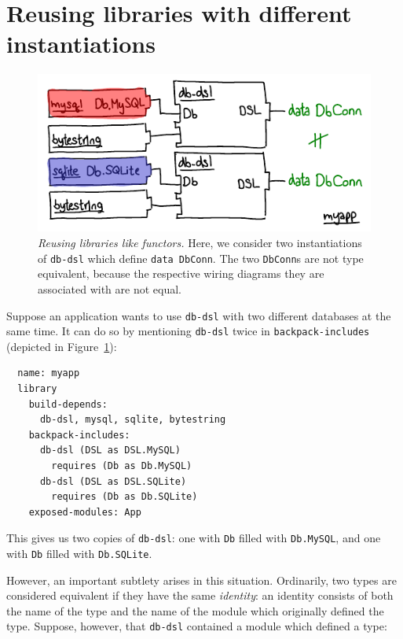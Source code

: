 \section{Reusing libraries with different instantiations}

\begin{figure}
\includegraphics{diagrams/reusing-packages-functors.pdf}
\caption{\emph{Reusing libraries like functors.}  Here, we consider
two instantiations of \texttt{db-dsl} which define \texttt{data DbConn}.
The two \texttt{DbConn}s are not type equivalent, because the respective
wiring diagrams they are associated with are not equal.}
\label{fig:reusing-packages-functors}
\end{figure}

Suppose an application wants to use \verb|db-dsl| with two different databases
at the same time. It can do so by mentioning \verb|db-dsl| twice in
\verb|backpack-includes| (depicted in Figure~\ref{fig:reusing-packages-functors}):

\begin{verbatim}
  name: myapp
  library
    build-depends:
      db-dsl, mysql, sqlite, bytestring
    backpack-includes:
      db-dsl (DSL as DSL.MySQL)
        requires (Db as Db.MySQL)
      db-dsl (DSL as DSL.SQLite)
        requires (Db as Db.SQLite)
    exposed-modules: App
\end{verbatim}
%
This gives us two copies of \verb|db-dsl|: one with \verb|Db| filled
with \verb|Db.MySQL|, and one with \verb|Db| filled with
\verb|Db.SQLite|.

However, an important subtlety arises in
this situation.  Ordinarily, two types are considered equivalent if they
have the same \emph{identity}: an identity consists of both the name of the
type and the name of the module which originally defined the type.
Suppose, however, that \verb|db-dsl| contained a module which defined
a type:


